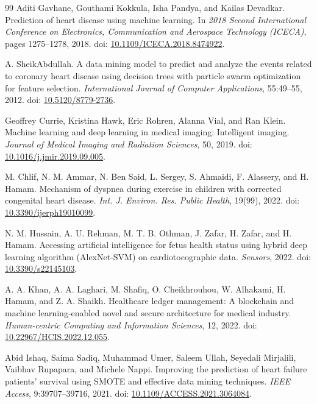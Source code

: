 \begin{thebibliography}{99}
 Aditi Gavhane, Gouthami Kokkula, Isha Pandya, and Kailas Devadkar. Prediction of heart disease using machine learning. In \emph{2018 Second International Conference on Electronics, Communication and Aerospace Technology (ICECA)}, pages 1275--1278, 2018. doi: \href{https://doi.org/10.1109/ICECA.2018.8474922}{10.1109/ICECA.2018.8474922}.

 A. SheikAbdullah. A data mining model to predict and analyze the events related to coronary heart disease using decision trees with particle swarm optimization for feature selection. \emph{International Journal of Computer Applications}, 55:49--55, 2012. doi: \href{https://doi.org/10.5120/8779-2736}{10.5120/8779-2736}.

 Geoffrey Currie, Kristina Hawk, Eric Rohren, Alanna Vial, and Ran Klein. Machine learning and deep learning in medical imaging: Intelligent imaging. \emph{Journal of Medical Imaging and Radiation Sciences}, 50, 2019. doi: \href{https://doi.org/10.1016/j.jmir.2019.09.005}{10.1016/j.jmir.2019.09.005}.

 M. Chlif, N. M. Ammar, N. Ben Said, L. Sergey, S. Ahmaidi, F. Alassery, and H. Hamam. Mechanism of dyspnea during exercise in children with corrected congenital heart disease. \emph{Int. J. Environ. Res. Public Health}, 19(99), 2022. doi: \href{https://doi.org/10.3390/ijerph19010099}{10.3390/ijerph19010099}.

 N. M. Hussain, A. U. Rehman, M. T. B. Othman, J. Zafar, H. Zafar, and H. Hamam. Accessing artificial intelligence for fetus health status using hybrid deep learning algorithm (AlexNet-SVM) on cardiotocographic data. \emph{Sensors}, 2022. doi: \href{https://doi.org/10.3390/s22145103}{10.3390/s22145103}.

 A. A. Khan, A. A. Laghari, M. Shafiq, O. Cheikhrouhou, W. Alhakami, H. Hamam, and Z. A. Shaikh. Healthcare ledger management: A blockchain and machine learning-enabled novel and secure architecture for medical industry. \emph{Human-centric Computing and Information Sciences}, 12, 2022. doi: \href{https://doi.org/10.22967/HCIS.2022.12.055}{10.22967/HCIS.2022.12.055}.

 Abid Ishaq, Saima Sadiq, Muhammad Umer, Saleem Ullah, Seyedali Mirjalili, Vaibhav Rupapara, and Michele Nappi. Improving the prediction of heart failure patients' survival using SMOTE and effective data mining techniques. \emph{IEEE Access}, 9:39707--39716, 2021. doi: \href{https://doi.org/10.1109/ACCESS.2021.3064084}{10.1109/ACCESS.2021.3064084}.


\end{thebibliography}

